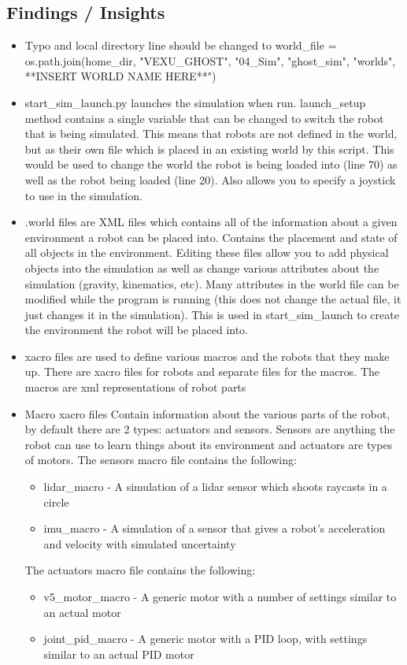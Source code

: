 \subsection{Findings / Insights}
\begin{itemize}
    \item Typo and local directory line should be changed to world\_file = os.path.join(home\_dir, "VEXU\_GHOST", "04\_Sim", "ghost\_sim", "worlds", **INSERT WORLD NAME HERE**")
    \item start\_sim\_launch.py launches the simulation when run. launch\_setup method contains a single variable that can be changed to switch the robot that is being simulated. This means that robots are not defined in the world, but as their own file which is placed in an existing world by this script. This would be used to change the world the robot is being loaded into (line 70) as well as the robot being loaded (line 20). Also allows you to specify a joystick to use in the simulation.
    \item .world files are XML files which contains all of the information about a given environment a robot can be placed into. Contains the placement and state of all objects in the environment. Editing these files allow you to add physical objects into the simulation as well as change various attributes about the simulation (gravity, kinematics, etc). Many attributes in the world file can be modified while the program is running (this does not change the actual file, it just changes it in the simulation). This is used in start\_sim\_launch to create the environment the robot will be placed into.
    \item xacro files are used to define various macros and the robots that they make up. There are xacro files for robots and separate files for the macros. The macros are xml representations of robot parts
    \item Macro xacro files Contain information about the various parts of the robot, by default there are 2 types: actuators and sensors. Sensors are anything the robot can use to learn things about its environment and actuators are types of motors. The sensors macro file contains the following: 
    \begin{itemize}
        \item lidar\_macro - A simulation of a lidar sensor which shoots raycasts in a circle 
        \item imu\_macro - A simulation of a sensor that gives a robot's acceleration and velocity with simulated uncertainty
    \end{itemize}
    The actuators macro file contains the following: 
    \begin{itemize}
        \item v5\_motor\_macro - A generic motor with a number of settings similar to an actual motor
        \item joint\_pid\_macro - A generic motor with a PID loop, with settings similar to an actual PID motor
    \end{itemize}
\end{itemize}
